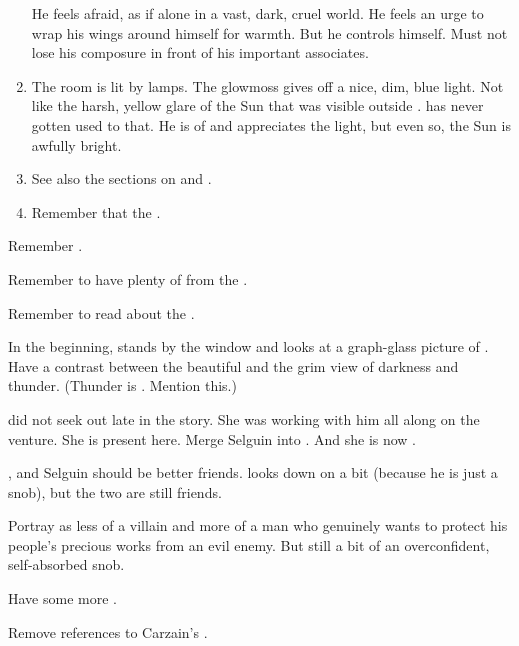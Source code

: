 \begin{changes}
\begin{enumerate}
        He feels afraid, as if alone in a vast, dark, cruel world.
        He feels an urge to wrap his wings around himself for warmth.
        But he controls himself.
        Must not lose his composure in front of his important associates.
      \item 
        The room is lit by  lamps. 
        The glowmoss gives off a nice, dim, blue light. 
        Not like the harsh, yellow glare of the Sun that was visible outside \Nyx. 
        \Teshrial{} has never gotten used to that. 
        He is of \CiriathSepher{} and appreciates the light, but even so, the Sun is awfully bright. 
      \item 
        See also the sections on  and . 
      \item 
        Remember that the .
    \end{enumerate}
    
    Remember . 
    
    Remember to have plenty of  from the \resphain. 
    
    Remember to read about the . 
    
    In the beginning, \Teshrial stands by the window and looks at a graph-glass picture of \Firaxel. 
    Have a contrast between the beautiful \Firaxel and the grim view of darkness and thunder. 
    (Thunder is . Mention this.)
    
    \Teshrial did not seek out \Urizeth late in the story.
    She was working with him all along on the \Malcur venture.
    She is present here.
    Merge Selguin into \Urizeth. 
    And she is now \CiriathSepher. 
  
    \Teshrial, \Ganethed{} and Selguin should be better friends. 
    \Teshrial{} looks down on \Ganethed{} a bit (because he is just a snob), but the two are still friends. 
    
    Portray \Teshrial{} as less of a villain and more of a man who genuinely wants to protect his people's precious works from an evil enemy. 
    But still a bit of an overconfident, self-absorbed snob. 
    
    Have some more . 
    
    Remove references to Carzain's \vertexspike. 
    

\end{changes}
